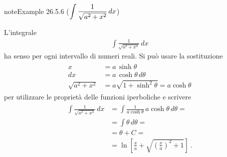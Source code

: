 \documentclass[letterpaper,10pt,italian]{jupyterBook}
\begin{document}
\begin{sphinxadmonition}{note}{Example 26.5.6 (\protect\(\displaystyle \int \frac{1}{\sqrt{a^2 + x^2}} \,  dx\protect\))}



\sphinxAtStartPar
L’integrale
\begin{equation*}
\begin{split}\int \frac{1}{\sqrt{a^2 + x^2}} \,  dx\end{split}
\end{equation*}
\sphinxAtStartPar
ha senso per ogni intervallo di numeri reali. Si può usare la sostituzione
\begin{equation*}
\begin{split}\begin{aligned}
   x & = a \, \sinh \theta \\
  dx & = a \, \cosh \theta \, d \theta \\
  \sqrt{a^2 + x^2} & = a \sqrt{1 + \sinh^2 \theta} = a \cosh \theta
\end{aligned}\end{split}
\end{equation*}
\sphinxAtStartPar
per utilizzare le proprietà delle funzioni iperboliche e scrivere
\begin{equation*}
\begin{split}\begin{aligned}
  \int \frac{1}{\sqrt{a^2 + x^2}} \, dx
   & = \int \frac{1}{a \cosh \theta} \, a \cosh \theta \, d \theta = \\
   & = \int \theta \, d \theta = \\
   & = \theta + C = \\
   & = \ln \left[ \frac{x}{a}  +  \sqrt{\left( \frac{x}{a} \right)^2 + 1} \right] \ .
\end{aligned}\end{split}
\end{equation*}\end{sphinxadmonition}
\label{ch/infinitesimal_calculus/integrals:integrals-methods-sub-6}
\end{document}
